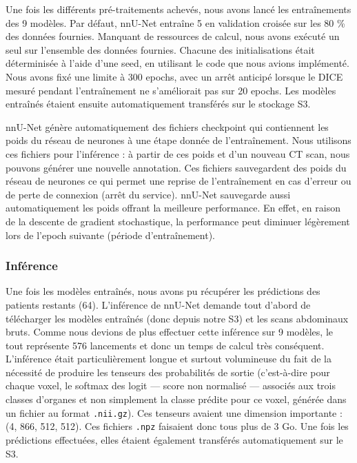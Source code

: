 \documentclass[a4paper,french,bookmarks,12pt]{article}
\begin{document}
    Une fois les différents pré-traitements achevés, nous avons lancé les entraînements des 9 modèles. Par défaut, nnU-Net entraîne 5  en validation croisée sur les 80 \% des données fournies. Manquant de ressources de calcul, nous avons exécuté un seul  sur l'ensemble des données fournies. Chacune des initialisations était déterminisée à l'aide d'une seed, en utilisant le code que nous avions implémenté. Nous avons fixé une limite à 300 epochs, avec un arrêt anticipé lorsque le DICE mesuré pendant l'entraînement ne s'améliorait pas sur 20 epochs. Les modèles entraînés étaient ensuite automatiquement transférés sur le stockage S3.

    nnU-Net génère automatiquement des fichiers checkpoint qui contiennent les poids du réseau de neurones à une étape donnée de l'entraînement. Nous utilisons ces fichiers pour l'inférence : à partir de ces poids et d'un nouveau CT scan, nous pouvons générer une nouvelle annotation. Ces fichiers sauvegardent des poids du réseau de neurones ce qui permet une reprise de l'entraînement en cas d'erreur ou de perte de connexion (arrêt du service). nnU-Net sauvegarde aussi automatiquement les poids offrant la meilleure performance. En effet, en raison de la descente de gradient stochastique, la performance peut diminuer légèrement lors de l'epoch suivante (période d'entraînement).  

    

    \subsubsection*{Inférence}

    Une fois les modèles entraînés, nous avons pu récupérer les prédictions des patients restants (64). L'inférence de nnU-Net demande tout d'abord de télécharger les modèles entraînés (donc depuis notre S3) et les scans abdominaux bruts. Comme nous devions de plus effectuer cette inférence sur 9 modèles, le tout représente 576 lancements et donc un temps de calcul très conséquent. L'inférence était particulièrement longue et surtout volumineuse du fait de la nécessité de produire les tenseurs des probabilités de sortie (c'est-à-dire pour chaque voxel, le softmax des logit --- score non normalisé --- associés aux trois classes d'organes et non simplement la classe prédite pour ce voxel, générée dans un fichier au format \texttt{.nii.gz}). Ces tenseurs avaient une dimension importante : (4, 866, 512, 512). Ces fichiers \texttt{.npz} faisaient donc tous plus de 3 Go. Une fois les prédictions effectuées, elles étaient également transférés automatiquement sur le S3.
\end{document}
